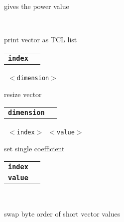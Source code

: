 \begin{description}
\begin{description}
        gives the power value

       \texttt{ } \

        print vector as TCL list

      \begin{tabular}{ll}
 \texttt{\textbf{index}} &    \\
      \end{tabular}
       \texttt{ $<$dimension$>$} \

        resize vector

      \begin{tabular}{ll}
 \texttt{\textbf{dimension}} &    \\
      \end{tabular}
       \texttt{ $<$index$>$ $<$value$>$} \

        set single coefficient

      \begin{tabular}{ll}
 \texttt{\textbf{index}} &    \\
 \texttt{\textbf{value}} &    \\
      \end{tabular}
       \texttt{} \

        swap byte order of short vector values

    \end{description}

\end{description}

